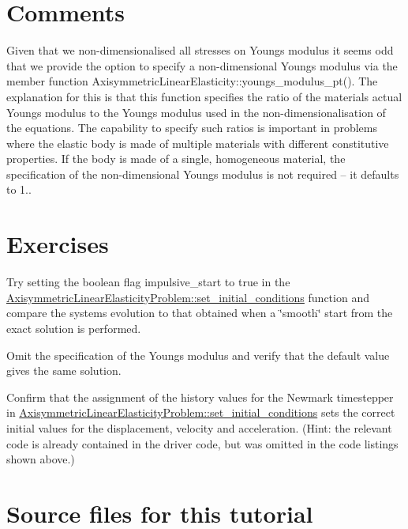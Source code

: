  

\hypertarget{index_comments}{}\section{Comments}\label{index_comments}

\begin{DoxyItemize}
\item Given that we non-\/dimensionalised all stresses on Young\textquotesingle{}s modulus it seems odd that we provide the option to specify a non-\/dimensional Young\textquotesingle{}s modulus via the member function {\ttfamily Axisymmetric\+Linear\+Elasticity\+::youngs\+\_\+modulus\+\_\+pt()}. The explanation for this is that this function specifies the ratio of the material\textquotesingle{}s actual Young\textquotesingle{}s modulus to the Young\textquotesingle{}s modulus used in the non-\/dimensionalisation of the equations. The capability to specify such ratios is important in problems where the elastic body is made of multiple materials with different constitutive properties. If the body is made of a single, homogeneous material, the specification of the non-\/dimensional Young\textquotesingle{}s modulus is not required -- it defaults to 1..
\end{DoxyItemize}\hypertarget{index_exercises}{}\section{Exercises}\label{index_exercises}

\begin{DoxyItemize}
\item Try setting the boolean flag {\ttfamily impulsive\+\_\+start} to {\ttfamily true} in the {\ttfamily \hyperlink{classAxisymmetricLinearElasticityProblem_a6b0263b6f783652a1d8151948f4b9430}{Axisymmetric\+Linear\+Elasticity\+Problem\+::set\+\_\+initial\+\_\+conditions}} function and compare the system\textquotesingle{}s evolution to that obtained when a \char`\"{}smooth\char`\"{} start from the exact solution is performed.
\item Omit the specification of the Young\textquotesingle{}s modulus and verify that the default value gives the same solution.
\item Confirm that the assignment of the history values for the Newmark timestepper in {\ttfamily \hyperlink{classAxisymmetricLinearElasticityProblem_a6b0263b6f783652a1d8151948f4b9430}{Axisymmetric\+Linear\+Elasticity\+Problem\+::set\+\_\+initial\+\_\+conditions}} sets the correct initial values for the displacement, velocity and acceleration. (Hint\+: the relevant code is already contained in the driver code, but was omitted in the code listings shown above.)
\end{DoxyItemize}\hypertarget{index_sources}{}\section{Source files for this tutorial}\label{index_sources}

